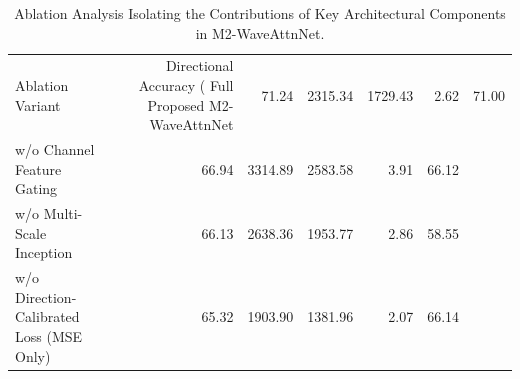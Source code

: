 \begin{table}
\caption{Ablation Analysis Isolating the Contributions of Key Architectural Components in M2-WaveAttnNet.}
\label{tab:ablation_results}
\begin{tabular}{lrrrrr}
\toprule
Ablation Variant & Directional Accuracy (%
\midrule
Full Proposed M2-WaveAttnNet & 71.24 & 2315.34 & 1729.43 & 2.62 & 71.00 \\
w/o Channel Feature Gating & 66.94 & 3314.89 & 2583.58 & 3.91 & 66.12 \\
w/o Multi-Scale Inception & 66.13 & 2638.36 & 1953.77 & 2.86 & 58.55 \\
w/o Direction-Calibrated Loss (MSE Only) & 65.32 & 1903.90 & 1381.96 & 2.07 & 66.14 \\
\bottomrule
\end{tabular}
\end{table}
